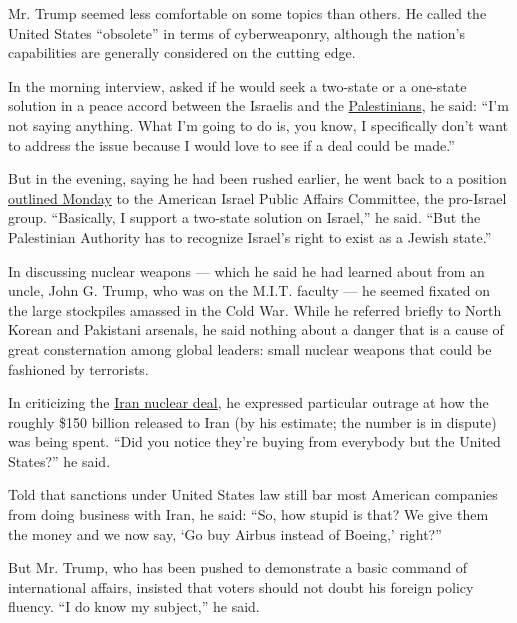 Mr. Trump seemed less comfortable on some topics than others. He called
the United States ``obsolete'' in terms of cyberweaponry, although the
nation's capabilities are generally considered on the cutting edge.

In the morning interview, asked if he would seek a two-state or a
one-state solution in a peace accord between the Israelis and the
\href{http://topics.nytimes3xbfgragh.onion/top/reference/timestopics/subjects/p/palestinians/index.html?inline=nyt-classifier}{Palestinians},
he said: ``I'm not saying anything. What I'm going to do is, you know, I
specifically don't want to address the issue because I would love to see
if a deal could be made.''

But in the evening, saying he had been rushed earlier, he went back to a
position
\href{http://www.nytimes3xbfgragh.onion/politics/first-draft/2016/03/21/donald-trump-calls-himself-lifelong-supporter-of-israel/}{outlined
Monday} to the American Israel Public Affairs Committee, the pro-Israel
group. ``Basically, I support a two-state solution on Israel,'' he said.
``But the Palestinian Authority has to recognize Israel's right to exist
as a Jewish state.''

In discussing nuclear weapons --- which he said he had learned about
from an uncle, John G. Trump, who was on the M.I.T. faculty --- he
seemed fixated on the large stockpiles amassed in the Cold War. While he
referred briefly to North Korean and Pakistani arsenals, he said nothing
about a danger that is a cause of great consternation among global
leaders: small nuclear weapons that could be fashioned by terrorists.

In criticizing the
\href{http://www.nytimes3xbfgragh.onion/2015/07/15/world/middleeast/iran-nuclear-deal-is-reached-after-long-negotiations.html}{Iran
nuclear deal}, he expressed particular outrage at how the roughly \$150
billion released to Iran (by his estimate; the number is in dispute) was
being spent. ``Did you notice they're buying from everybody but the
United States?'' he said.

Told that sanctions under United States law still bar most American
companies from doing business with Iran, he said: ``So, how stupid is
that? We give them the money and we now say, `Go buy Airbus instead of
Boeing,' right?''

But Mr. Trump, who has been pushed to demonstrate a basic command of
international affairs, insisted that voters should not doubt his foreign
policy fluency. ``I do know my subject,'' he said.

